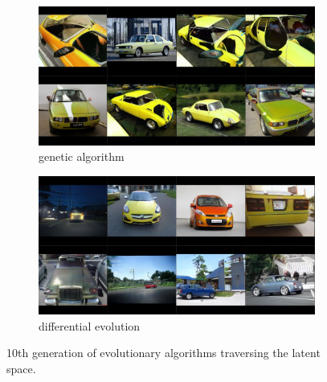 \documentclass[11pt,a4paper,openany]{book}
\begin{document}
\begin{figure}[H]
\centering
\begin{subfigure}[b]{1.0\textwidth}
   \includegraphics[width=1\linewidth]{GA_yellowcar_10.PNG}
   \caption{genetic algorithm}
   \label{fig:Ng1} 
\end{subfigure}

\begin{subfigure}[b]{1.0\textwidth}
   \includegraphics[width=1\linewidth]{DE_yellowcar_10.PNG}
   \caption{differential evolution}
   \label{fig:Ng2}
\end{subfigure}

\caption[Two numerical solutions]{10th generation of evolutionary algorithms traversing the latent space.}
\end{figure}

\newpage
\end{document}
